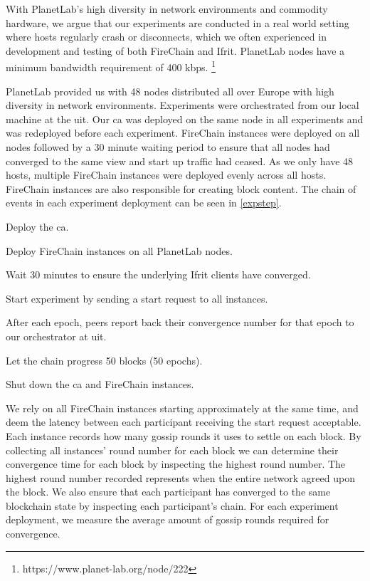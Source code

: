 \documentclass[USenglish]{uit-thesis}
\begin{document}
With PlanetLab's high diversity in network environments and commodity hardware, we argue that our experiments are conducted in a real world setting where hosts regularly crash or disconnects, which we often experienced in development and testing of both FireChain and Ifrit.
PlanetLab nodes have a minimum bandwidth requirement of 400 \gls{kbps}. \footnote{https://www.planet-lab.org/node/222}

PlanetLab provided us with 48 nodes distributed all over Europe with high diversity in network environments.
Experiments were orchestrated from our local machine at the \gls{uit}.
Our \gls{ca} was deployed on the same node in all experiments and was redeployed before each experiment.
FireChain instances were deployed on all nodes followed by a 30 minute waiting period to ensure that all nodes had converged to the same view and start up traffic had ceased.
As we only have 48 hosts, multiple FireChain instances were deployed evenly across all hosts.
FireChain instances are also responsible for creating block content.
The chain of events in each experiment deployment can be seen in \autoref{expstep}.
\begin{description}\label{expstep}
	\item[Step 1] Deploy the \gls{ca}.
	\item[Step 2] Deploy FireChain instances on all PlanetLab nodes.
	\item[Step 3] Wait 30 minutes to ensure the underlying Ifrit clients have converged.
	\item[Step 4] Start experiment by sending a start request to all instances.
	\item[Step 5] After each epoch, peers report back their convergence number for that epoch to our orchestrator at \gls{uit}.
	\item[Step 6] Let the chain progress 50 blocks (50 epochs).
	\item[Step 7] Shut down the \gls{ca} and FireChain instances.
\end{description}
We rely on all FireChain instances starting approximately at the same time, and deem the latency between each participant receiving the start request acceptable. 
Each instance records how many gossip rounds it uses to settle on each block.
By collecting all instances' round number for each block we can determine their convergence time for each block by inspecting the highest round number.
The highest round number recorded represents when the entire network agreed upon the block.
We also ensure that each participant has converged to the same blockchain state by inspecting each participant's chain.
For each experiment deployment, we measure the average amount of gossip rounds required for convergence.
\end{document}
